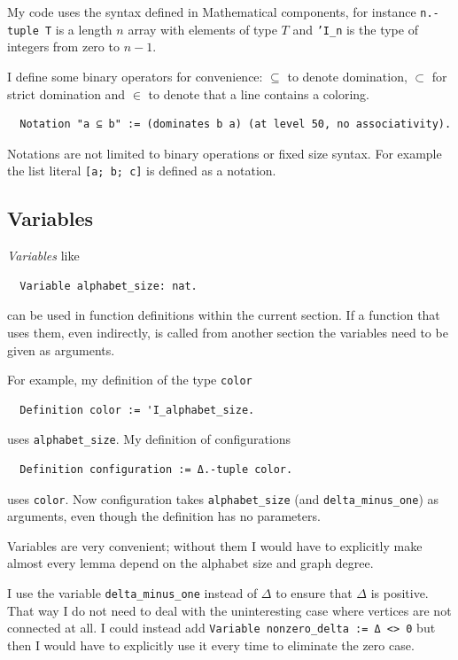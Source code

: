 \documentclass[english, 12pt, a4paper, sci, a-1b, online]{aaltothesis}
\newcommand\icoq[1]{\texttt{#1}}
\begin{document}
My code uses the syntax defined in Mathematical components, for instance \icoq{n.-tuple T} is a length $n$ array with elements of type $T$ and \icoq{'I_n} is the type of integers from zero to $n-1$.

I define some binary operators for convenience: $\subseteq$ to denote domination, $\subset$ for strict domination and $\in$ to denote that a line contains a coloring.
\begin{verbatim}
  Notation "a ⊆ b" := (dominates b a) (at level 50, no associativity).
\end{verbatim}

Notations are not limited to binary operations or fixed size syntax. For example the list literal \icoq{[a; b; c]} is defined as a notation.

\subsection{Variables}

\emph{Variables} like
\begin{verbatim}
  Variable alphabet_size: nat.
\end{verbatim}
can be used in function definitions within the current section. If a function that uses them, even indirectly, is called from another section the variables need to be given as arguments.

For example, my definition of the type \icoq{color}
\begin{verbatim}
  Definition color := 'I_alphabet_size.
\end{verbatim}
uses \icoq{alphabet_size}. My definition of configurations
\begin{verbatim}
  Definition configuration := Δ.-tuple color.
\end{verbatim}
uses \icoq{color}. Now configuration takes \icoq{alphabet_size} (and \icoq{delta_minus_one}) as arguments, even though the definition has no parameters.

Variables are very convenient; without them I would have to explicitly make almost every lemma depend on the alphabet size and graph degree.

I use the variable \icoq{delta_minus_one} instead of $\Delta$ to ensure that $\Delta$ is positive. That way I do not need to deal with the uninteresting case where vertices are not connected at all. I could instead add \icoq{Variable nonzero_delta := Δ <> 0} but then I would have to explicitly use it every time to eliminate the zero case.
\end{document}
